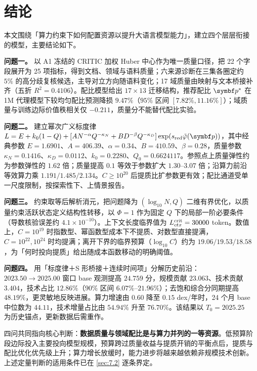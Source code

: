 \section{结论}
\label{sec:8}

本文围绕「算力约束下如何配置资源以提升大语言模型能力」，建立四个层层衔接的模型，主要结论如下。

\textbf{问题一。} 以 A1 冻结的 CRITIC 加权 Huber 中心作为唯一质量口径，把 22 个字段展开为 25 项指标，得到文档、领域与语料质量；六来源诊断在三集各圈定约 $5\%$ 的高分歧复核候选，主导对立方向随语料变化；17 域质量由映射与文本桥接补齐（五折 $R^2=0.4106$）。配比模型给出 $17\times13$ 迁移结构，推荐配比 $\bp^*$ 在 1M 代理模型下较均匀配比预测降损 $9.47\%$（$95\%$ 区间 $[7.82\%,11.16\%]$）；域质量与训练边际价值秩相关仅 $-0.211$，质量分不能替代配比实验。

\textbf{问题二。} 建立幂次广义标度律 $L=E+k_0(1-Q)+[AN^{-\alpha}Q^{-\kappa_N}+BD^{-\beta}Q^{-\kappa_D}]\exp(s_{\rm red}\tilde\varphi(\bp))$，其中经典参数 $E=1.6901$、$A=406.39$、$\alpha=0.34$、$B=410.59$、$\beta=0.28$，质量参数 $\kappa_N=0.1416$、$\kappa_D=0.0112$、$k_0=0.2280$、$Q_0=0.6624117$。参照点上质量弹性约为参数弹性的 $1.62$ 倍；质量提高 $0.1$ 等效于参数扩大 $1.30$–$3.07$ 倍；沿算力前沿等效算力乘 $1.191/1.485/2.134$。$C\ge10^{20}$ 后提质比扩参数更有效；配比通道受单一尺度限制，按探索性下、上情景报告。

\textbf{问题三。} 约束取等后解析消元，把问题降为 $(\log_{10}N,Q)$ 二维有界优化，以质量约束活跃状态定义结构性转移，以 $\Phi=1$ 作为固定 $Q$ 下的局部一阶必要条件（导数核验误差约 $4.1\times10^{-10}$）。上下文长度临界值为 $L_{ctx}^{\rm crit}=30000$ token。数值上，$C=10^{19}$ 时指数型、幂函数型成本下不提质、对数型直接提满，$C=10^{22},10^{24}$ 时均提满；离开下界的临界预算（$\log_{10}C$）约为 $19.06/19.53/18.58$，为「何时投向提质」给出随成本函数移动的明确阈值。

\textbf{问题四。} 用「标度律＋S 形桥接＋连续时间项」分解历史前沿：$2023.50\to2025.00$ 窗口 base 观测提高 $24.759$ 分，规模贡献 $23.063$、技术贡献 $3.404$，技术占比 $12.86\%$（$90\%$ 区间 $6.07\%$–$21.96\%$）；去饱和综合分同期提高 $48.19\%$，更灵敏地反映进展。算力增速由 $0.60$ 降至 $0.15$ dex/年时，24 个月 base 中位数为 $44.11$，技术增量占比由 $54.94\%$ 升至 $76.70\%$。该结果以 $T_0=2025.25$ 为历史锚点，更新数据后需重作。

四问共同指向核心判断：\textbf{数据质量与领域配比是与算力并列的一等资源}。低预算阶段边际投入主要投向模型规模，预算跨过质量收益与提质开销的平衡点后，提质与配比优化优先级上升；算力增长放缓时，能力进步将越来越依赖非规模技术创新。上述定量判断的适用条件已在 \ref{sec:7.2} 逐条界定。
